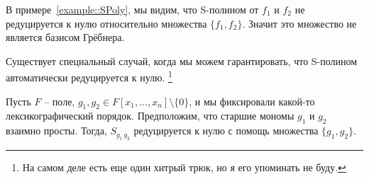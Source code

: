 \begin{remark}
В примере~\ref{example::SPoly}, мы видим, что S-полином от $f_1$ и $f_2$ не редуцируется к нулю относительно множества $\{f_1, f_2\}$.
Значит это множество не является базисом Грёбнера.
\end{remark}

Существует специальный случай, когда мы можем гарантировать, что S-полином автоматически редуцируется к нулю.%
\footnote{На самом деле есть еще один хитрый трюк, но я его упоминать не буду.}

\begin{claim}
Пусть $F$ -- поле, $g_1,g_2\in F[x_1,\ldots,x_n]\setminus\{0\}$, и мы фиксировали какой-то лексикографический порядок.
Предположим, что старшие мономы $g_1$ и $g_2$ взаимно просты.
Тогда, $S_{g_1\,g_2}$ редуцируется к нулю с помощь множества $\{g_1,g_2\}$.
\end{claim}
